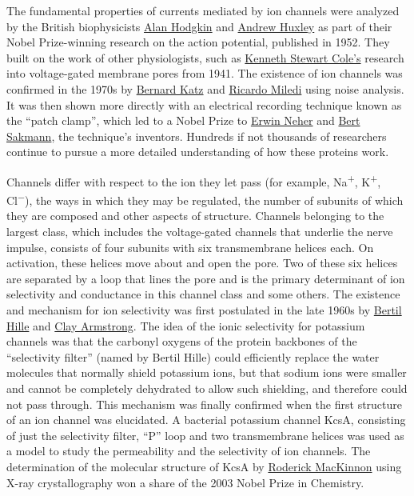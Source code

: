 The fundamental properties of currents mediated by ion channels were analyzed by the British biophysicists \href{https://en.wikipedia.org/wiki/Alan_Hodgkin}{Alan Hodgkin} and \href{https://en.wikipedia.org/wiki/Andrew_Huxley}{Andrew Huxley} as part of their Nobel Prize-winning research on the action potential, published in 1952. They built on the work of other physiologists, such as \href{https://en.wikipedia.org/wiki/Kenneth_Stewart_Cole}{Kenneth Stewart Cole's} research into voltage-gated membrane pores from 1941. The existence of ion channels was confirmed in the 1970s by \href{https://en.wikipedia.org/wiki/Bernard_Katz}{Bernard Katz} and \href{https://en.wikipedia.org/wiki/Ricardo_Miledi}{Ricardo Miledi} using noise analysis. It was then shown more directly with an electrical recording technique known as the ``patch clamp'', which led to a Nobel Prize to \href{https://en.wikipedia.org/wiki/Erwin_Neher}{Erwin Neher} and \href{https://en.wikipedia.org/wiki/Bert_Sakmann}{Bert Sakmann}, the technique's inventors. Hundreds if not thousands of researchers continue to pursue a more detailed understanding of how these proteins work.

Channels differ with respect to the ion they let pass (for example, Na\textsuperscript{+}, K\textsuperscript{+}, Cl\textsuperscript{−}), the ways in which they may be regulated, the number of subunits of which they are composed and other aspects of structure. Channels belonging to the largest class, which includes the voltage-gated channels that underlie the nerve impulse, consists of four subunits with six transmembrane helices each. On activation, these helices move about and open the pore. Two of these six helices are separated by a loop that lines the pore and is the primary determinant of ion selectivity and conductance in this channel class and some others. The existence and mechanism for ion selectivity was first postulated in the late 1960s by \href{https://en.wikipedia.org/wiki/Bertil_Hille}{Bertil Hille} and \href{https://en.wikipedia.org/wiki/Clay_Armstrong}{Clay Armstrong}. The idea of the ionic selectivity for potassium channels was that the carbonyl oxygens of the protein backbones of the ``selectivity filter'' (named by Bertil Hille) could efficiently replace the water molecules that normally shield potassium ions, but that sodium ions were smaller and cannot be completely dehydrated to allow such shielding, and therefore could not pass through. This mechanism was finally confirmed when the first structure of an ion channel was elucidated. A bacterial potassium channel KcsA, consisting of just the selectivity filter, ``P'' loop and two transmembrane helices was used as a model to study the permeability and the selectivity of ion channels. The determination of the molecular structure of KcsA by \href{https://en.wikipedia.org/wiki/Roderick_MacKinnon}{Roderick MacKinnon} using X-ray crystallography won a share of the 2003 Nobel Prize in Chemistry.



